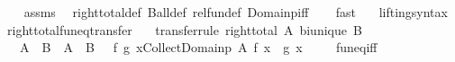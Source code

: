 \begin{isabellebody}
%
\isadelimproof
\ \ %
\endisadelimproof
%
\isatagproof
{}\isamarkupfalse%
\ assms\ \isamarkupfalse%
\ right{\isacharunderscore}{\kern0pt}total{\isacharunderscore}{\kern0pt}def\ Ball{\isacharunderscore}{\kern0pt}def\ rel{\isacharunderscore}{\kern0pt}fun{\isacharunderscore}{\kern0pt}def\ Domainp{\isacharunderscore}{\kern0pt}iff\isanewline
\ \ \isamarkupfalse%
\ fast%
\endisatagproof
{\isafoldproof}%
%
\isadelimproof
\isanewline
%
\endisadelimproof
\isanewline
{}\isamarkupfalse%
\isanewline
\ \ \ lifting{\isacharunderscore}{\kern0pt}syntax\isanewline
{}\isanewline
\isanewline
{}\isamarkupfalse%
\ right{\isacharunderscore}{\kern0pt}total{\isacharunderscore}{\kern0pt}fun{\isacharunderscore}{\kern0pt}eq{\isacharunderscore}{\kern0pt}transfer{\isacharcolon}{\kern0pt}\isanewline
\ \ \ {\isacharbrackleft}{\kern0pt}transfer{\isacharunderscore}{\kern0pt}rule{\isacharbrackright}{\kern0pt}{\isacharcolon}{\kern0pt}\ {\isachardoublequoteopen}right{\isacharunderscore}{\kern0pt}total\ A{\isachardoublequoteclose}\ {\isachardoublequoteopen}bi{\isacharunderscore}{\kern0pt}unique\ B{\isachardoublequoteclose}\isanewline
\ \ \ {\isachardoublequoteopen}{\isacharparenleft}{\kern0pt}{\isacharparenleft}{\kern0pt}A\ {\isacharequal}{\kern0pt}{\isacharequal}{\kern0pt}{\isacharequal}{\kern0pt}{\isachargreater}{\kern0pt}\ B{\isacharparenright}{\kern0pt}\ {\isacharequal}{\kern0pt}{\isacharequal}{\kern0pt}{\isacharequal}{\kern0pt}{\isachargreater}{\kern0pt}\ {\isacharparenleft}{\kern0pt}A\ {\isacharequal}{\kern0pt}{\isacharequal}{\kern0pt}{\isacharequal}{\kern0pt}{\isachargreater}{\kern0pt}\ B{\isacharparenright}{\kern0pt}\ {\isacharequal}{\kern0pt}{\isacharequal}{\kern0pt}{\isacharequal}{\kern0pt}{\isachargreater}{\kern0pt}\ {\isacharparenleft}{\kern0pt}{\isacharequal}{\kern0pt}{\isacharparenright}{\kern0pt}{\isacharparenright}{\kern0pt}\ {\isacharparenleft}{\kern0pt}{\isasymlambda}f\ g{\isachardot}{\kern0pt}\ {\isasymforall}x{\isasymin}Collect{\isacharparenleft}{\kern0pt}Domainp\ A{\isacharparenright}{\kern0pt}{\isachardot}{\kern0pt}\ f\ x\ {\isacharequal}{\kern0pt}\ g\ x{\isacharparenright}{\kern0pt}\ {\isacharparenleft}{\kern0pt}{\isacharequal}{\kern0pt}{\isacharparenright}{\kern0pt}{\isachardoublequoteclose}\isanewline
%
\isadelimproof
\ \ %
\endisadelimproof
%
\isatagproof
{}\isamarkupfalse%
\ fun{\isacharunderscore}{\kern0pt}eq{\isacharunderscore}{\kern0pt}iff\isanewline
\ \ \isamarkupfalse%

\end{isabellebody}
